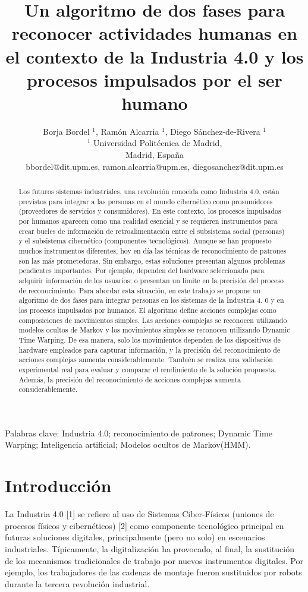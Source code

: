\documentclass[10pt]{article}
\title {\textbf{Un algoritmo de dos fases para reconocer actividades humanas en el contexto de la Industria 4.0 y los procesos impulsados por el ser humano }}
\author{Borja Bordel $^{1}$, Ramón Alcarria ${ }^{1}$, Diego Sánchez-de-Rivera ${ }^{1}$\\
${ }^{1}$ Universidad Politécnica de Madrid,\\
Madrid, España\\
bbordel@dit.upm.es, ramon.alcarria@upm.es, diegosanchez@dit.upm.es}
\date{}
\begin{document}
\maketitle


\begin{abstract}
 Los futuros sistemas industriales, una revolución conocida como Industria 4.0, están previstos para integrar a las personas en el mundo cibernético como prosumidores (proveedores de servicios y consumidores). En este contexto, los procesos impulsados por humanos aparecen como una realidad esencial y se requieren instrumentos para crear bucles de información de retroalimentación entre el subsistema social (personas) y el subsistema cibernético (componentes tecnológicos). Aunque se han propuesto muchos instrumentos diferentes, hoy en día las técnicas de reconocimiento de patrones son las más prometedoras. Sin embargo, estas soluciones presentan algunos problemas pendientes importantes. Por ejemplo, dependen del hardware seleccionado para adquirir información de los usuarios; o presentan un límite en la precisión del proceso de reconocimiento. Para abordar esta situación, en este trabajo se propone un algoritmo de dos fases para integrar personas en los sistemas de la Industria 4. 0 y en los procesos impulsados por humanos. El algoritmo define acciones complejas como composiciones de movimientos simples. Las acciones complejas se reconocen utilizando modelos ocultos de Markov y los movimientos simples se reconocen utilizando Dynamic Time Warping. De esa manera, solo los movimientos dependen de los dispositivos de hardware empleados para capturar información, y la precisión del reconocimiento de acciones complejas aumenta considerablemente. También se realiza una validación experimental real para evaluar y comparar el rendimiento de la solución propuesta. Además, la precisión del reconocimiento de acciones complejas aumenta considerablemente.

\end{abstract}

Palabras clave: Industria 4.0; reconocimiento de patrones; Dynamic Time Warping; Inteligencia artificial; Modelos ocultos de Markov(HMM).

\section{Introducción}
La Industria 4.0 [1] se refiere al uso de Sistemas Ciber-Físicos (uniones de procesos físicos y cibernéticos) [2] como componente tecnológico principal en futuras soluciones digitales, principalmente (pero no solo) en escenarios industriales. Típicamente, la digitalización ha provocado, al final, la sustitución de los mecanismos tradicionales de trabajo por nuevos instrumentos digitales. Por ejemplo, los trabajadores de las cadenas de montaje fueron sustituidos por robots durante la tercera revolución industrial. 
\newline
\end{document}
